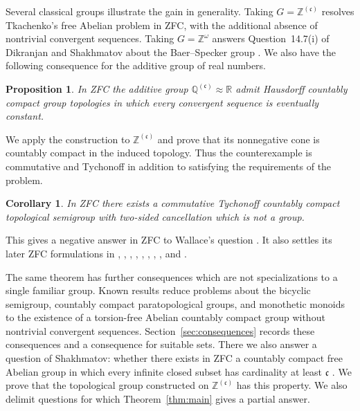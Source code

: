 \documentclass[11pt]{amsart}
\newtheorem{corollary}[theorem]{Corollary}
\newtheorem{proposition}[theorem]{Proposition}
\theoremstyle{definition}
\newcommand{\Z}{\mathbb Z}
\newcommand{\Q}{\mathbb Q}
\newcommand{\cfrak}{\mathfrak c}
\begin{document}
Several classical groups illustrate the gain in generality.  Taking
$G=\Z^{(\cfrak)}$ resolves Tkachenko's free Abelian problem in ZFC, with the
additional absence of nontrivial convergent sequences.  Taking
$G=\Z^\omega$ answers Question~14.7(i) of Dikranjan and Shakhmatov about the
Baer--Specker group \cite{DikranjanShakhmatov2005}.
We also have the following consequence for the additive group of real numbers.

\begin{proposition}\label{prop:rational}
In ZFC the additive group $\Q^{(\cfrak)}\approx\mathbb R$ admit Hausdorff
countably compact group topologies in which every convergent sequence is
eventually constant.
\end{proposition}

We apply the construction to
$\Z^{(\cfrak)}$ and prove that its nonnegative cone is countably compact in the
induced topology.  Thus the counterexample is commutative and Tychonoff in
addition to satisfying the requirements of the problem.

\begin{corollary}\label{cor:wallace}
In ZFC there exists a commutative Tychonoff countably compact topological
semigroup with two-sided cancellation which is not a group.
\end{corollary}

This gives a negative answer in ZFC to Wallace's question
\cite{Wallace1955,Comfort1990}.  It also settles its later ZFC formulations in
\cite[p.~12]{Shakhmatov2001}, \cite[p.~524]{Tkachenko2002Between},
\cite[Problem~523]{Pearl2004},
\cite[Question~5.1(a)]{BoeroPereiraTomita2019},
\cite[Question~19]{HrusakShibakov2021},
\cite[Question~5.5]{HrusakVanMillRamosShelah2021},
\cite[Problem~6.4]{BelliniRodriguesTomita2021Forcing},
\cite[Question~6.7]{TomitaTrianonFraga2022}, and
\cite[Question~6.3]{BelliniHartRodriguesTomita2023}.

The same theorem has further consequences which are not specializations to a
single familiar group.  Known results reduce problems about the
bicyclic semigroup, countably compact paratopological groups, and monothetic
monoids to the existence of a torsion-free Abelian countably compact group
without nontrivial convergent sequences.  Section~\ref{sec:consequences}
records these consequences and a consequence for suitable sets.  There we also
answer a question of Shakhmatov: whether there exists in ZFC a countably
compact free Abelian group in which every infinite closed subset has
cardinality at least $\cfrak$ \cite[p.~13]{Shakhmatov2001}.  We prove that
the topological group constructed on $\Z^{(\cfrak)}$ has this property.
We also delimit questions for which Theorem~\ref{thm:main} gives a partial answer.
\end{document}

